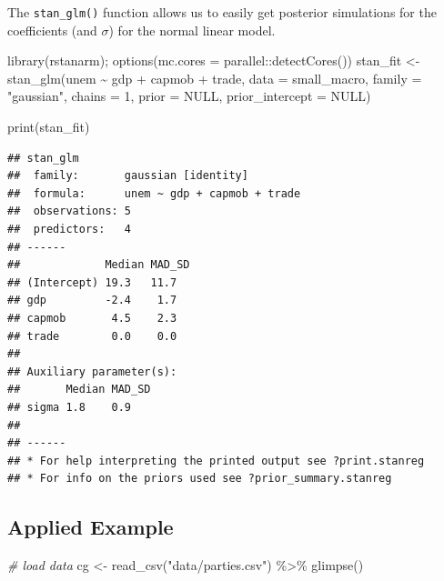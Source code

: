 \documentclass[
]{book}
\newenvironment{Shaded}{\begin{snugshade}}{\end{snugshade}}
\newcommand{\AttributeTok}[1]{\textcolor[rgb]{0.77,0.63,0.00}{#1}}
\newcommand{\CommentTok}[1]{\textcolor[rgb]{0.56,0.35,0.01}{\textit{#1}}}
\newcommand{\ConstantTok}[1]{\textcolor[rgb]{0.00,0.00,0.00}{#1}}
\newcommand{\DecValTok}[1]{\textcolor[rgb]{0.00,0.00,0.81}{#1}}
\newcommand{\FunctionTok}[1]{\textcolor[rgb]{0.00,0.00,0.00}{#1}}
\newcommand{\NormalTok}[1]{#1}
\newcommand{\OtherTok}[1]{\textcolor[rgb]{0.56,0.35,0.01}{#1}}
\newcommand{\SpecialCharTok}[1]{\textcolor[rgb]{0.00,0.00,0.00}{#1}}
\newcommand{\StringTok}[1]{\textcolor[rgb]{0.31,0.60,0.02}{#1}}
\begin{document}
The \texttt{stan\_glm()} function allows us to easily get posterior
simulations for the coefficients (and \(\sigma\)) for the normal linear
model.

\begin{Shaded}
\begin{Highlighting}[]
\FunctionTok{library}\NormalTok{(rstanarm); }\FunctionTok{options}\NormalTok{(}\AttributeTok{mc.cores =}\NormalTok{ parallel}\SpecialCharTok{::}\FunctionTok{detectCores}\NormalTok{())}
\NormalTok{stan\_fit }\OtherTok{\textless{}{-}} \FunctionTok{stan\_glm}\NormalTok{(unem }\SpecialCharTok{\textasciitilde{}}\NormalTok{ gdp }\SpecialCharTok{+}\NormalTok{ capmob }\SpecialCharTok{+}\NormalTok{ trade, }\AttributeTok{data =}\NormalTok{ small\_macro, }
                     \AttributeTok{family =} \StringTok{"gaussian"}\NormalTok{, }
                     \AttributeTok{chains =} \DecValTok{1}\NormalTok{, }
                     \AttributeTok{prior =} \ConstantTok{NULL}\NormalTok{,}
                     \AttributeTok{prior\_intercept =} \ConstantTok{NULL}\NormalTok{)}
\end{Highlighting}
\end{Shaded}

\begin{Shaded}
\begin{Highlighting}[]
\FunctionTok{print}\NormalTok{(stan\_fit)}
\end{Highlighting}
\end{Shaded}

\begin{verbatim}
## stan_glm
##  family:       gaussian [identity]
##  formula:      unem ~ gdp + capmob + trade
##  observations: 5
##  predictors:   4
## ------
##             Median MAD_SD
## (Intercept) 19.3   11.7  
## gdp         -2.4    1.7  
## capmob       4.5    2.3  
## trade        0.0    0.0  
## 
## Auxiliary parameter(s):
##       Median MAD_SD
## sigma 1.8    0.9   
## 
## ------
## * For help interpreting the printed output see ?print.stanreg
## * For info on the priors used see ?prior_summary.stanreg
\end{verbatim}

\hypertarget{applied-example}{%
\subsection{Applied Example}\label{applied-example}}

\begin{Shaded}
\begin{Highlighting}[]
\CommentTok{\# load data}
\NormalTok{cg }\OtherTok{\textless{}{-}} \FunctionTok{read\_csv}\NormalTok{(}\StringTok{"data/parties.csv"}\NormalTok{) }\SpecialCharTok{\%\textgreater{}\%}
  \FunctionTok{glimpse}\NormalTok{()}
\end{Highlighting}
\end{Shaded}
\end{document}
